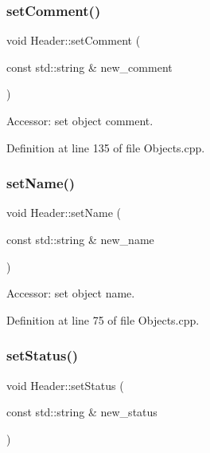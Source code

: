 \subsubsection{\texorpdfstring{set\+Comment()}{setComment()}}
{\footnotesize\ttfamily void Header\+::set\+Comment (\begin{DoxyParamCaption}\item[{const std\+::string \&}]{new\+\_\+comment }\end{DoxyParamCaption})}



Accessor\+: set object comment. 



Definition at line 135 of file Objects.\+cpp.

\hypertarget{class_d_d4hep_1_1_geometry_1_1_header_ae65f0f1c5b9f6c5697d0831a19b4056c}{}\label{class_d_d4hep_1_1_geometry_1_1_header_ae65f0f1c5b9f6c5697d0831a19b4056c} 
\subsubsection{\texorpdfstring{set\+Name()}{setName()}}
{\footnotesize\ttfamily void Header\+::set\+Name (\begin{DoxyParamCaption}\item[{const std\+::string \&}]{new\+\_\+name }\end{DoxyParamCaption})}



Accessor\+: set object name. 



Definition at line 75 of file Objects.\+cpp.

\hypertarget{class_d_d4hep_1_1_geometry_1_1_header_a16e8e70fe306e468d81ff2691612cd6d}{}\label{class_d_d4hep_1_1_geometry_1_1_header_a16e8e70fe306e468d81ff2691612cd6d} 
\subsubsection{\texorpdfstring{set\+Status()}{setStatus()}}
{\footnotesize\ttfamily void Header\+::set\+Status (\begin{DoxyParamCaption}\item[{const std\+::string \&}]{new\+\_\+status }\end{DoxyParamCaption})}



